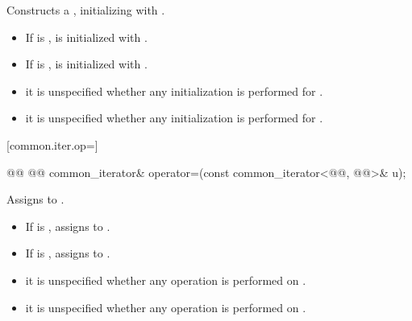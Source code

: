 \begin{addedblock}
\begin{itemdescr}
\pnum
\effects Constructs a , initializing
 with .
\begin{itemize}
\item If  is ,  is initialized with .
\item If  is ,  is initialized with .
\end{itemize}

\newtxt{
\remarks}
\begin{itemize}
\item {} it is unspecified whether any initialization
is performed for .
\item {} it is unspecified whether any initialization
is performed for .
\end{itemize}
\end{itemdescr}

[common.iter.op=]{}

%
%
\begin{itemdecl}
@@
  @@
common_iterator& operator=(const common_iterator<@@, @@>& u);
\end{itemdecl}

\begin{itemdescr}
\pnum
\effects Assigns  to .
\begin{itemize}
\item If  is , assigns  to .
\item If  is , assigns  to .
\end{itemize}

\newtxt{
\remarks}
\begin{itemize}
\item {} it is unspecified whether any operation
is performed on .
\item {} it is unspecified whether any operation
is performed on .
\end{itemize}


\end{itemdescr}
\end{addedblock}
